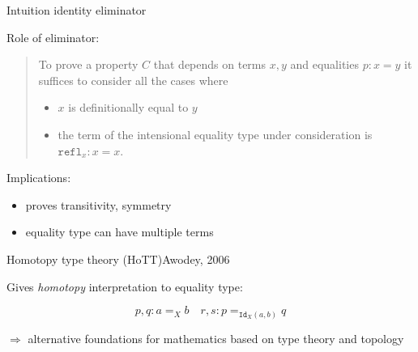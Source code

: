 \documentclass[english,draft]{beamer}
\begin{document}
\begin{frame}{Intuition identity eliminator}

    Role of eliminator:
    \begin{quotation}
        To prove a property $C$ that depends on terms $x,y$ and equalities $p:x=y$  it suffices to consider all the cases where
        
        \begin{itemize}
            \item $x$ is definitionally equal to $y$
            \item the term of the intensional equality type under consideration is $\texttt{refl}_x : x = x$.
        \end{itemize}
        \end{quotation}

        Implications:
        \begin{itemize}
            \item proves transitivity, symmetry
            \item equality type can have multiple terms
        \end{itemize}

\end{frame}


\begin{frame}{Homotopy type theory (HoTT)}{Awodey, 2006}

Gives \emph{homotopy} interpretation to equality type:

\centering
$$ p,q : a =_X b \quad r,s : p =_{\texttt{Id}_X(a,b)} q$$ 




$\Rightarrow$ alternative foundations for mathematics based on type theory and topology

\end{frame}



\end{document}
